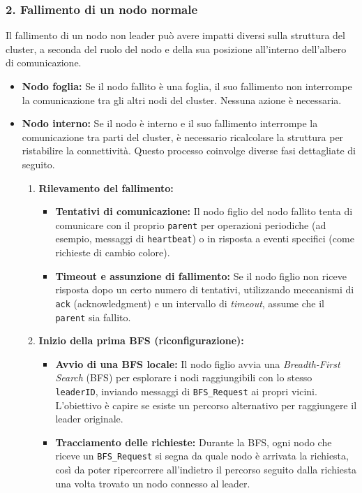 \documentclass[12pt, a4paper]{report}
\begin{document}
\subsubsection{2. Fallimento di un nodo normale}
\label{subsubsec:fallimento_nodo_normale}
Il fallimento di un nodo non leader pu\`o avere impatti diversi sulla struttura del cluster, a seconda del ruolo del nodo e della sua posizione all'interno dell'albero di comunicazione.

\begin{itemize}
    \item \textbf{Nodo foglia:} Se il nodo fallito \`e una foglia, il suo fallimento non interrompe la comunicazione tra gli altri nodi del cluster. Nessuna azione \`e necessaria.
    
    \item \textbf{Nodo interno:} Se il nodo \`e interno e il suo fallimento interrompe la comunicazione tra parti del cluster, \`e necessario ricalcolare la struttura per ristabilire la connettivit\`a. Questo processo coinvolge diverse fasi dettagliate di seguito.

    \newpage
    \begin{enumerate}
        \item \textbf{Rilevamento del fallimento:}
        \begin{itemize}
            \item \textbf{Tentativi di comunicazione:} Il nodo figlio del nodo fallito tenta di comunicare con il proprio \texttt{parent} per operazioni periodiche (ad esempio, messaggi di \texttt{heartbeat}) o in risposta a eventi specifici (come richieste di cambio colore).
            \item \textbf{Timeout e assunzione di fallimento:} Se il nodo figlio non riceve risposta dopo un certo numero di tentativi, utilizzando meccanismi di \texttt{ack} (acknowledgment) e un intervallo di \textit{timeout}, assume che il \texttt{parent} sia fallito.
        \end{itemize}
        
        \item \textbf{Inizio della prima BFS (riconfigurazione):}
        \begin{itemize}
            \item \textbf{Avvio di una BFS locale:} Il nodo figlio avvia una \textit{Breadth-First Search} (BFS) per esplorare i nodi raggiungibili con lo stesso \texttt{leaderID}, inviando messaggi di \texttt{BFS\_Request} ai propri vicini. L'obiettivo \`e capire se esiste un percorso alternativo per raggiungere il leader originale.
            \item \textbf{Tracciamento delle richieste:} Durante la BFS, ogni nodo che riceve un \texttt{BFS\_Request} si segna da quale nodo \`e arrivata la richiesta, così da poter ripercorrere all'indietro il percorso seguito dalla richiesta una volta trovato un nodo connesso al leader.
        \end{itemize}
        

\end{enumerate}
\end{itemize}
\end{document}

